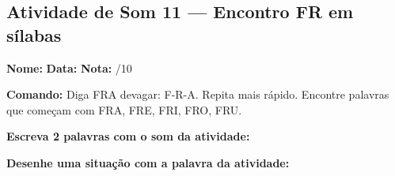 \subsection{Atividade de Som 11 --- Encontro FR em sílabas}
\begin{exercicio}



\noindent\textbf{Nome:} \underline{\hspace{3.2cm}} \quad \textbf{Data:} \underline{\hspace{1.6cm}} \quad \textbf{Nota:} \underline{\hspace{0.9cm}}/10


\noindent\textbf{Comando:} Diga FRA devagar: F-R-A. Repita mais rápido. Encontre palavras que começam com FRA, FRE, FRI, FRO, FRU.


\begin{center}
\end{center}

\noindent\textbf{Escreva 2 palavras com o som da atividade:}

\begin{center}
  \underline{\hspace{3cm}} \quad \underline{\hspace{3cm}}
\end{center}

\noindent\textbf{Desenhe uma situação com a palavra da atividade:}

\begin{center}
\end{center}

\end{exercicio}



